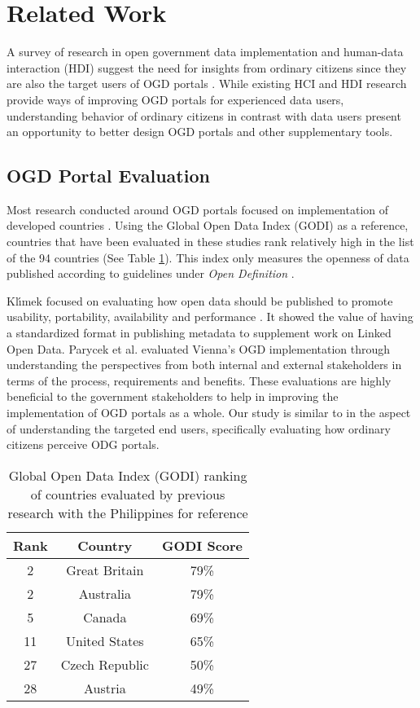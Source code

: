 \documentclass{sigchi}
\begin{document}
\section{Related Work}
A survey of research in open government data implementation and human-data interaction (HDI) suggest the need for insights from ordinary citizens since they are also the target users of OGD portals \cite{warwick2017}. While existing HCI and HDI research provide ways of improving OGD portals for experienced data users, understanding behavior of ordinary citizens in contrast with data users present an opportunity to better design OGD portals and other supplementary tools. 

\subsection{OGD Portal Evaluation}
Most research conducted around OGD portals focused on implementation of developed countries \cite{kacprzak2019characterising, klimek2019dcat, koesten2019collaborative,Parycek2014}. Using the Global Open Data Index (GODI) as a reference, countries that have been evaluated in these studies rank relatively high in the list of the 94 countries (See Table \ref{tab:godi})\cite{godimetric2016}. This index only measures the openness of data published according to guidelines under \textit{Open Definition} \cite{godimetric2016}. 

Kl{\'\i}mek focused on evaluating how open data should be published to promote usability, portability, availability and performance \cite{klimek2019dcat}. It showed the value of having a standardized format in publishing metadata to supplement work on Linked Open Data. Parycek et al. \cite{Parycek2014} evaluated Vienna's OGD implementation through understanding the perspectives from both internal and external stakeholders in terms of the process, requirements and benefits. These evaluations are highly beneficial to the government stakeholders to help in improving the implementation of OGD portals as a whole. Our study is similar to \cite{Parycek2014} in the aspect of understanding the targeted end users, specifically evaluating how ordinary citizens perceive ODG portals.

\begin{table}
    \centering
    \begin{tabular}{c c c}
         \textbf{Rank} & \textbf{Country} & \textbf{GODI Score} \\
         \midrule
         2 & Great Britain & 79\% \\
         2 & Australia & 79\% \\
         5 & Canada & 69\% \\
         11 & United States & 65\% \\
         27 & Czech Republic & 50\% \\
         28 & Austria & 49\% \\ 
    \end{tabular}
    \caption{Global Open Data Index (GODI) ranking of countries evaluated by previous research with the Philippines for reference}
    \label{tab:godi}
\end{table}
\end{document}
